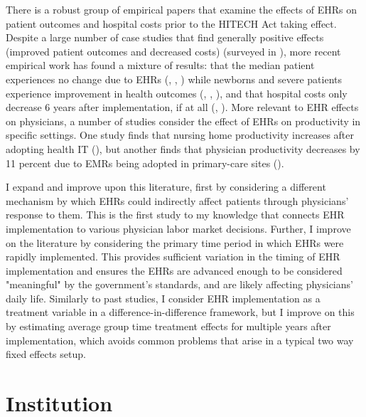 \documentclass[11pt]{article}
\begin{document}
There is a robust group of empirical papers that examine the effects of EHRs on patient outcomes and hospital costs prior to the HITECH Act taking effect. Despite a large number of case studies that find generally positive effects (improved patient outcomes and decreased costs) (surveyed in \cite{Buntin2011TheResults}), more recent empirical work has found a mixture of results: that the median patient experiences no change due to EHRs (\cite{Agha2014TheCare}, \cite{McCullough2016HealthCoordination}, \cite{Meyerhoefer}) while newborns and severe patients experience improvement in health outcomes (\cite{Miller2009}, \cite{Freedman2015}, \cite{McCullough2016HealthCoordination}), and that hospital costs only decrease 6 years after implementation, if at all (\cite{Agha2014TheCare}, \cite{dranove2014trillion}). More relevant to EHR effects on physicians, a number of studies consider the effect of EHRs on productivity in specific settings. One study finds that nursing home productivity increases after adopting health IT (\cite{Hitt2016}), but another finds that physician productivity decreases by 11 percent due to EMRs being adopted in primary-care sites (\cite{Meyerhoefer}). 

I expand and improve upon this literature, first by considering a different mechanism by which EHRs could indirectly affect patients through physicians' response to them. This is the first study to my knowledge that connects EHR implementation to various physician labor market decisions. Further, I improve on the literature by considering the primary time period in which EHRs were rapidly implemented. This provides sufficient variation in the timing of EHR implementation and ensures the EHRs are advanced enough to be considered "meaningful" by the government's standards, and are likely affecting physicians' daily life. Similarly to past studies, I consider EHR implementation as a treatment variable in a difference-in-difference framework, but I improve on this by estimating average group time treatment effects for multiple years after implementation, which avoids common problems that arise in a typical two way fixed effects setup.  




\section{Institution}
\end{document}
